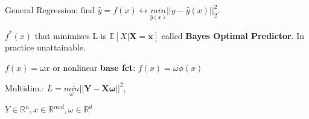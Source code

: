 General Regression: find $\hat{y} = f(x) \leftrightarrow \underset{\hat{y}(x)}{min} ||y - \hat{y}(x)||_2^2$.

$f^*(x)$ that minimizes L is $\mathbb{E}[X|\boldsymbol{X=x}]$ called \textbf{Bayes Optimal Predictor}. In practice unattainable.

$f(x) = \omega x$ or nonlinear \textbf{base fct}: $f(x) = \omega\phi(x)$

Multidim.: $L = \underset{\omega}{min}||\boldsymbol{Y-X\omega||}^2$, 

$Y \in \mathbb{R}^n, x \in \mathbb{R}^{nxd},\omega \in \mathbb{R}^d$





